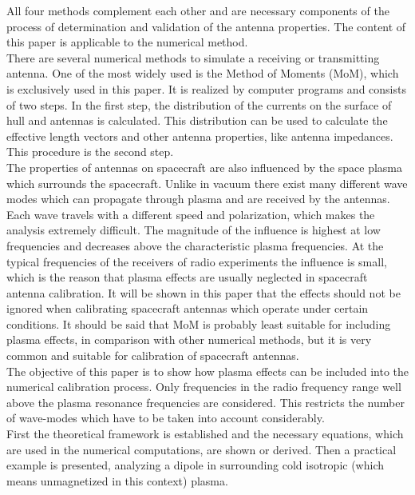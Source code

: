 \documentclass[two-column,ras]{agutex}
\begin{document}
\begin{article}
All four methods complement each other and are necessary components of the process of determination and validation of the antenna properties. The content of this paper is applicable to the numerical method.\\

There are several numerical methods to simulate a receiving or transmitting antenna. One of the most widely used is the Method of Moments
(MoM), which is exclusively used in this paper. It is realized by computer programs and consists of two steps. In the first step, the distribution of the currents on the surface of hull and antennas is calculated. This distribution can be used to calculate the effective length vectors and other antenna properties, like antenna impedances. This procedure is the second step.\\

The properties of antennas on spacecraft are also influenced by the space plasma which surrounds the spacecraft. Unlike in vacuum there exist many different wave modes which can propagate through plasma and are received by the antennas. Each wave travels with a different speed and polarization, which makes the analysis extremely difficult. The magnitude of the influence is highest at low frequencies and decreases above the characteristic plasma frequencies. At the typical frequencies of the receivers of radio experiments the influence is small, which is the reason that plasma effects are usually neglected in spacecraft antenna calibration. It will be shown in this paper that the effects should not be ignored when calibrating spacecraft antennas which operate under certain conditions. It should be said that MoM is probably least suitable for including plasma effects, in comparison with other numerical methods, but it is very common and suitable for calibration of spacecraft antennas.\\

The objective of this paper is to show how plasma effects can be included into the numerical calibration process. Only frequencies in the radio frequency range well above the plasma resonance frequencies are considered. This restricts the number of wave-modes which have to be taken into account considerably.\\

First the theoretical framework is established and the necessary equations, which are used in the numerical computations, are shown or derived. Then a practical example is presented, analyzing a dipole in surrounding cold isotropic (which means unmagnetized in this context) plasma.\\


\end{article}
\end{document}
